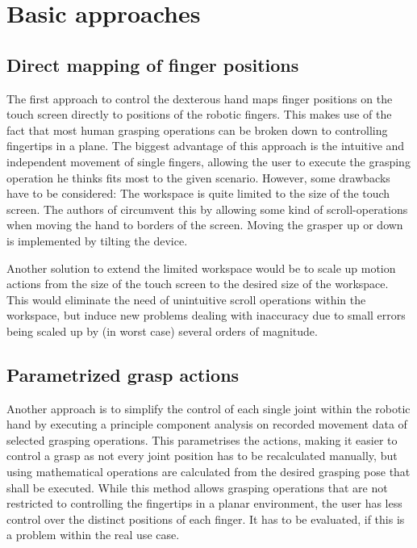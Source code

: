 \documentclass[a4paper]{article}
\begin{document}
\section{Basic approaches}

\subsection{Direct mapping of finger positions}
\label{sec:direct}
The first approach to control the dexterous hand maps finger positions on the touch screen directly to positions of the robotic fingers. This makes use of the fact that most human grasping operations can be broken down to controlling fingertips in a plane\cite[1]{conf/humanoids/TohHLBZP12}. The biggest advantage of this approach is the intuitive and independent movement of single fingers, allowing the user to execute the grasping operation he thinks fits most to the given scenario. However, some drawbacks have to be considered: The workspace is quite limited to the size of the touch screen. The authors of \cite{conf/humanoids/TohHLBZP12} circumvent this by allowing some kind of scroll-operations when moving the hand to borders of the screen. Moving the grasper up or down is implemented by tilting the device.

Another solution to extend the limited workspace would be to scale up motion actions from the size of the touch screen to the desired size of the workspace. This would eliminate the need of unintuitive scroll operations within the workspace, but induce new problems dealing with inaccuracy due to small errors being scaled up by (in worst case) several orders of magnitude. 

\subsection{Parametrized grasp actions}

Another approach is to simplify the control of each single joint within the robotic hand by executing a principle component analysis on recorded movement data of selected grasping operations\cite{uhh/techrep/paramnewactions}. This parametrises the actions, making it easier to control a grasp as not every joint position has to be recalculated manually, but using mathematical operations are calculated from the desired grasping pose that shall be executed. While this method allows grasping operations that are not restricted to controlling the fingertips in a planar environment, the user has less control over the distinct positions of each finger. It has to be evaluated, if this is a problem within the real use case.
\end{document}
